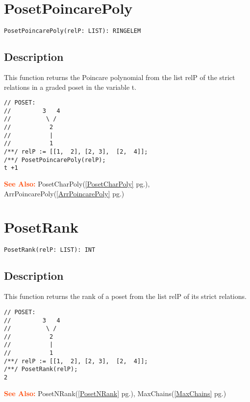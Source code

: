 \documentclass[a4paper]{mybook}
\newenvironment{command}{}{} %
\newcommand\SeeAlso{\par\textcolor{OrangeRed}{\textbf{\large See Also: }}}
\begin{document}
\section{PosetPoincarePoly}
\label{PosetPoincarePoly}
\begin{command} %


\begin{Verbatim}[label=syntax, rulecolor=\color{MidnightBlue},
frame=single]
PosetPoincarePoly(relP: LIST): RINGELEM
\end{Verbatim}


\subsection*{Description}

This function returns the Poincare polynomial from the list relP of the strict relations in a graded poset in the variable t.
\begin{Verbatim}[label=example, rulecolor=\color{PineGreen}, frame=single]
// POSET:
//         3   4
//          \ /
//           2
//           |
//           1
/**/ relP := [[1,  2], [2, 3],  [2,  4]];
/**/ PosetPoincarePoly(relP);
t +1
\end{Verbatim}


\SeeAlso %
  PosetCharPoly(\ref{PosetCharPoly} pg.\pageref{PosetCharPoly}), 
    ArrPoincarePoly(\ref{ArrPoincarePoly} pg.\pageref{ArrPoincarePoly})
\end{command} %

\section{PosetRank}
\label{PosetRank}
\begin{command} %


\begin{Verbatim}[label=syntax, rulecolor=\color{MidnightBlue},
frame=single]
PosetRank(relP: LIST): INT
\end{Verbatim}


\subsection*{Description}

This function returns the rank of a poset from the list relP of its strict relations.
\begin{Verbatim}[label=example, rulecolor=\color{PineGreen}, frame=single]
// POSET:
//         3   4
//          \ /
//           2
//           |
//           1
/**/ relP := [[1,  2], [2, 3],  [2,  4]];
/**/ PosetRank(relP);
2
\end{Verbatim}


\SeeAlso %
  PosetNRank(\ref{PosetNRank} pg.\pageref{PosetNRank}), 
    MaxChains(\ref{MaxChains} pg.\pageref{MaxChains})
\end{command} %
\end{document}
